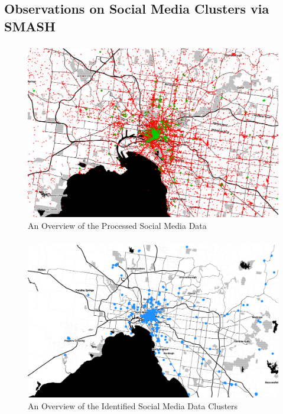 \subsection{Observations on Social Media Clusters via SMASH}
\begin{frame}
    \frametitle{}
    \begin{figure}		  
	    \includegraphics[width=0.95\columnwidth]{resource/figures/clustered_social_media_overview}
	    \centering
	    \vspace{-0.3cm}
	    \caption{\small An Overview of the Processed Social Media Data}
    \end{figure}
\end{frame}

\begin{frame}
    \frametitle{}
    \begin{figure}		  
	    \includegraphics[width=0.95\columnwidth]{resource/figures/socialmedia_clusters.png}
	    \centering
	    \vspace{-0.3cm}
	    \caption{\small An Overview of the Identified Social Media Data Clusters}
    \end{figure}
\end{frame}

